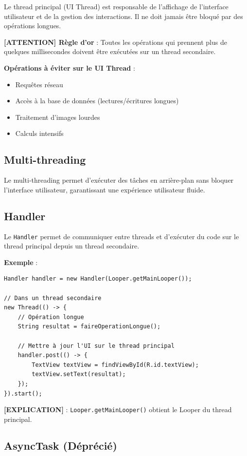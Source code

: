 \documentclass[11pt,a4paper]{article}
\begin{document}
Le thread principal (UI Thread) est responsable de l'affichage de l'interface utilisateur et de la gestion des interactions. Il ne doit jamais être bloqué par des opérations longues.

\textbf{[ATTENTION] Règle d'or} : Toutes les opérations qui prennent plus de quelques millisecondes doivent être exécutées sur un thread secondaire.

\textbf{Opérations à éviter sur le UI Thread} :
\begin{itemize}
    \item Requêtes réseau
    \item Accès à la base de données (lectures/écritures longues)
    \item Traitement d'images lourdes
    \item Calculs intensifs
\end{itemize}

\subsection{Multi-threading}

Le multi-threading permet d'exécuter des tâches en arrière-plan sans bloquer l'interface utilisateur, garantissant une expérience utilisateur fluide.

\subsection{Handler}

Le \texttt{Handler} permet de communiquer entre threads et d'exécuter du code sur le thread principal depuis un thread secondaire.

\textbf{Exemple} :
\begin{lstlisting}
Handler handler = new Handler(Looper.getMainLooper());

// Dans un thread secondaire
new Thread(() -> {
    // Opération longue
    String resultat = faireOperationLongue();
    
    // Mettre à jour l'UI sur le thread principal
    handler.post(() -> {
        TextView textView = findViewById(R.id.textView);
        textView.setText(resultat);
    });
}).start();
\end{lstlisting}

\textbf{[EXPLICATION]} : \texttt{Looper.getMainLooper()} obtient le Looper du thread principal.

\subsection{AsyncTask (Déprécié)}
\end{document}
